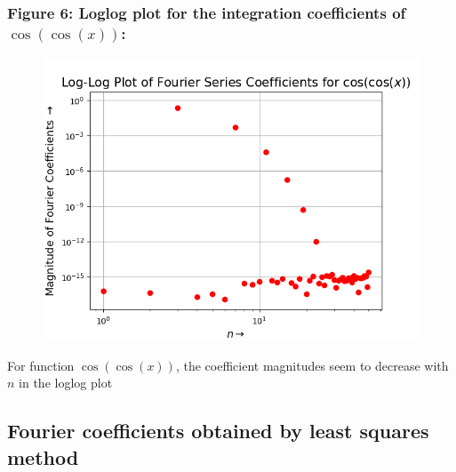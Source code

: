 \documentclass[12pt, a4paper]{article}
\begin{document}
\subsubsection{Figure 6: Loglog plot for the integration coefficients of $\cos(\cos(x))$:}
\vspace*{-0.5cm}
\begin{figure}[H]
    \centering
    \includegraphics[scale = 0.75]{Figure_6.png}
    \label{fig:sample}
\end{figure}
\vspace*{-0.5cm}
\begin{center}
    For function $\cos(\cos(x))$, the coefficient magnitudes seem to decrease with $n$ in the loglog plot
\end{center}

\subsection{Fourier coefficients obtained by least squares method}
\end{document}
